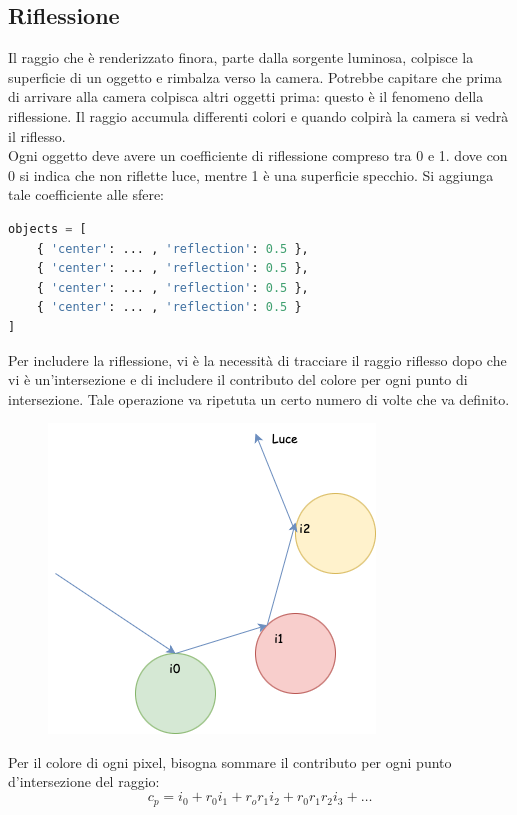 \documentclass[9pt,a4paper,twoside]{tau}
\begin{document}
\subsection{Riflessione}
Il raggio che è renderizzato finora, parte dalla sorgente luminosa, colpisce la superficie di un oggetto e rimbalza verso la camera. Potrebbe capitare che prima di arrivare alla camera colpisca altri oggetti prima: questo è il fenomeno della riflessione. Il raggio accumula differenti colori e quando colpirà la camera si vedrà il riflesso.\\
Ogni oggetto deve avere un coefficiente di riflessione compreso tra 0 e 1. dove con 0 si indica che non riflette luce, mentre 1 è una superficie specchio. Si aggiunga tale coefficiente alle sfere:
\begin{lstlisting}[language=Python]
objects = [
    { 'center': ... , 'reflection': 0.5 },
    { 'center': ... , 'reflection': 0.5 },
    { 'center': ... , 'reflection': 0.5 },
    { 'center': ... , 'reflection': 0.5 }
]
\end{lstlisting}
Per includere la riflessione, vi è la necessità di tracciare il raggio riflesso dopo che vi è un'intersezione e di includere il contributo del colore per ogni punto di intersezione. Tale operazione va ripetuta un certo numero di volte che va definito.
\begin{figure}[H]
    \centering
    \includegraphics[width=0.7\columnwidth]{Figures/20.png}
    \caption{}
    \label{fig:figure}
\end{figure}
Per il colore di ogni pixel, bisogna sommare il contributo per ogni punto d'intersezione del raggio:
\begin{equation*}
	c_p= i_0 + r_0i_1 + r_or_1i_2+r_0r_1r_2i_3 + \dots
\end{equation*}
\end{document}

